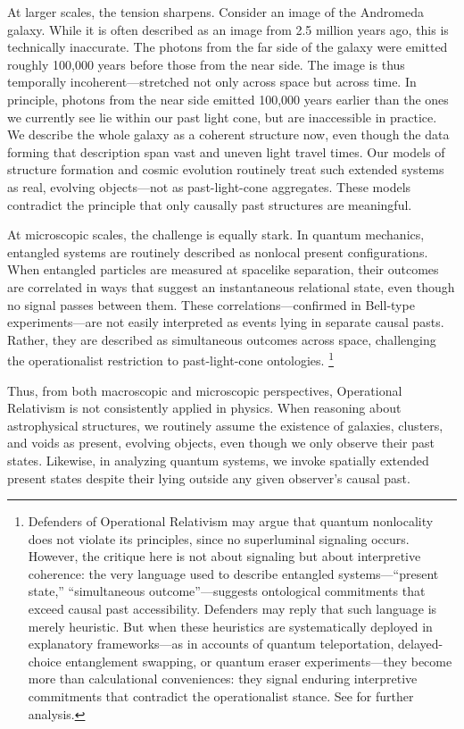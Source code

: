 \documentclass[12pt]{book}
\begin{document}
At larger scales, the tension sharpens. Consider an image of the Andromeda galaxy. While it is often described as an image from 2.5 million years ago, this is technically inaccurate. The photons from the far side of the galaxy were emitted roughly 100,000 years before those from the near side. The image is thus temporally incoherent---stretched not only across space but across time. In principle, photons from the near side emitted 100,000 years earlier than the ones we currently see lie within our past light cone, but are inaccessible in practice. We describe the whole galaxy as a coherent structure now, even though the data forming that description span vast and uneven light travel times. Our models of structure formation and cosmic evolution routinely treat such extended systems as real, evolving objects---not as past-light-cone aggregates. These models contradict the principle that only causally past structures are meaningful.

At microscopic scales, the challenge is equally stark. In quantum mechanics, entangled systems are routinely described as nonlocal present configurations. When entangled particles are measured at spacelike separation, their outcomes are correlated in ways that suggest an instantaneous relational state, even though no signal passes between them. These correlations---confirmed in Bell-type experiments---are not easily interpreted as events lying in separate causal pasts. Rather, they are described as simultaneous outcomes across space, challenging the operationalist restriction to past-light-cone ontologies. \footnote{Defenders of Operational Relativism may argue that quantum nonlocality does not violate its principles, since no superluminal signaling occurs. However, the critique here is not about signaling but about interpretive coherence: the very language used to describe entangled systems---``present state,'' ``simultaneous outcome''---suggests ontological commitments that exceed causal past accessibility. Defenders may reply that such language is merely heuristic. But when these heuristics are systematically deployed in explanatory frameworks---as in accounts of quantum teleportation, delayed-choice entanglement swapping, or quantum eraser experiments---they become more than calculational conveniences: they signal enduring interpretive commitments that contradict the operationalist stance. See \citet{Healey2012quantum, Bub2005quantum, Redhead1987, Mittelstaedt1998} for further analysis.}

Thus, from both macroscopic and microscopic perspectives, Operational Relativism is not consistently applied in physics. When reasoning about astrophysical structures, we routinely assume the existence of galaxies, clusters, and voids as present, evolving objects, even though we only observe their past states. Likewise, in analyzing quantum systems, we invoke spatially extended present states despite their lying outside any given observer's causal past.
\end{document}
